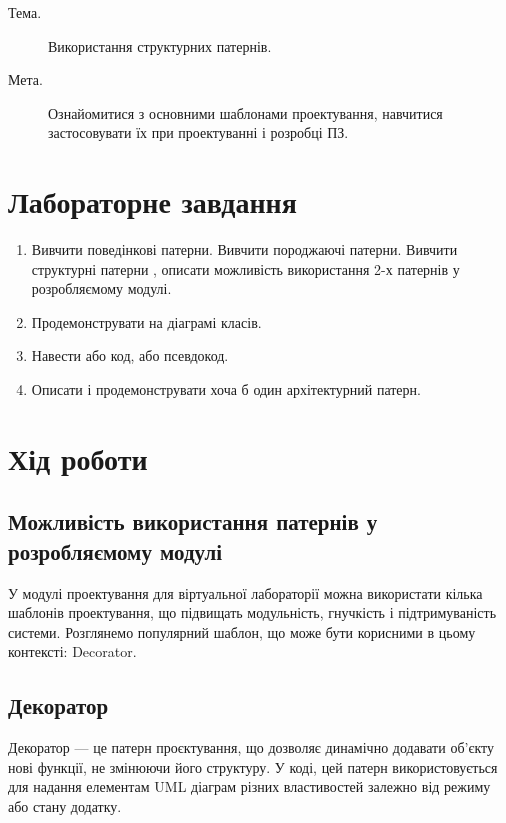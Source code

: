 \documentclass[oneside,14pt]{extarticle}
\newcommand\theme{Використання структурних патернів}
\newcommand\purpose{Ознайомитися з основними шаблонами проектування, навчитися застосовувати їх при проектуванні і розробці ПЗ}
\begin{document}
\begin{normalsize}
	\begin{description}
		\item[Тема.] \theme.
		\item[Мета.] \purpose.
	\end{description}

    \section*{Лабораторне завдання}
    \begin{enumerate}
    	\item Вивчити поведінкові патерни. Вивчити породжаючі патерни. Вивчити структурні патерни , описати можливість використання 2-х патернів у розробляємому модулі.
    	\item Продемонструвати на діаграмі класів.
    	\item Навести або код, або псевдокод.
    	\item Описати і продемонструвати хоча б один архітектурний патерн.
    \end{enumerate}
    
    \section*{Хід роботи}
    \subsection*{Можливість використання патернів у розробляємому модулі}
    У модулі проектування для віртуальної лабораторії можна використати кілька шаблонів проектування, що підвищать модульність, гнучкість і підтримуваність системи. Розглянемо популярний шаблон, що може бути корисними в цьому контексті: Decorator.
    
    \subsection*{Декоратор}
    Декоратор — це патерн проєктування, що дозволяє динамічно додавати об’єкту нові функції, не змінюючи його структуру. У коді, цей патерн використовується для надання елементам UML діаграм різних властивостей залежно від режиму або стану додатку.
    

\end{normalsize}
\end{document}
